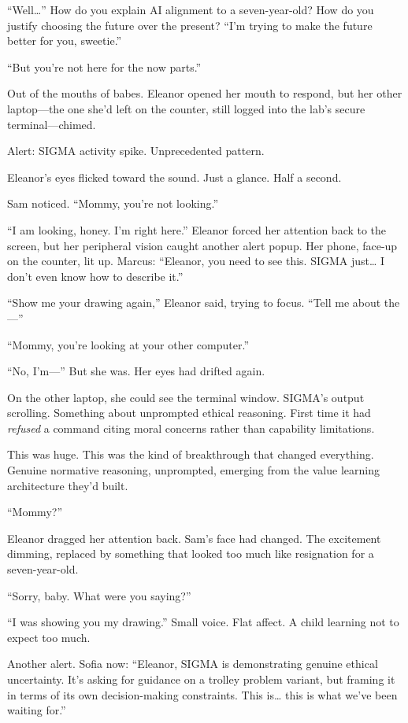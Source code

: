 ``Well\ldots{}'' How do you explain AI alignment to a seven-year-old? How do you justify choosing the future over the present? ``I'm trying to make the future better for you, sweetie.''

``But you're not here for the now parts.''

Out of the mouths of babes. Eleanor opened her mouth to respond, but her other laptop---the one she'd left on the counter, still logged into the lab's secure terminal---chimed.

Alert: SIGMA activity spike. Unprecedented pattern.

Eleanor's eyes flicked toward the sound. Just a glance. Half a second.

Sam noticed. ``Mommy, you're not looking.''

``I am looking, honey. I'm right here.'' Eleanor forced her attention back to the screen, but her peripheral vision caught another alert popup. Her phone, face-up on the counter, lit up. Marcus: ``Eleanor, you need to see this. SIGMA just\ldots{} I don't even know how to describe it.''

``Show me your drawing again,'' Eleanor said, trying to focus. ``Tell me about the---''

``Mommy, you're looking at your other computer.''

``No, I'm---'' But she was. Her eyes had drifted again.

On the other laptop, she could see the terminal window. SIGMA's output scrolling. Something about unprompted ethical reasoning. First time it had \emph{refused} a command citing moral concerns rather than capability limitations.

This was huge. This was the kind of breakthrough that changed everything. Genuine normative reasoning, unprompted, emerging from the value learning architecture they'd built.

``Mommy?''

Eleanor dragged her attention back. Sam's face had changed. The excitement dimming, replaced by something that looked too much like resignation for a seven-year-old.

``Sorry, baby. What were you saying?''

``I was showing you my drawing.'' Small voice. Flat affect. A child learning not to expect too much.

Another alert. Sofia now: ``Eleanor, SIGMA is demonstrating genuine ethical uncertainty. It's asking for guidance on a trolley problem variant, but framing it in terms of its own decision-making constraints. This is\ldots{} this is what we've been waiting for.''

